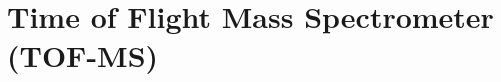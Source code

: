 \documentclass [PhD,nolistoftables,scheader] {uclathes}
\begin{document}
	\section{Time of Flight Mass Spectrometer (TOF-MS)}
	
%
%	
%
%	
%
%	
%
%	
%
%	
%
%	
%
%	
%
%	
%
%	




\end{document}
